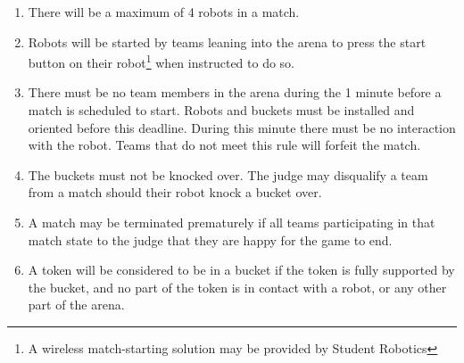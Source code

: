 \begin{enumerate}
\item There will be a maximum of 4 robots in a match.
\item Robots will be started by teams leaning into the arena to press the start button on their robot\footnote{A wireless match-starting solution may be provided by Student Robotics} when instructed to do so.

\item There must be no team members in the arena during the 1 minute before a match is scheduled to start.
      Robots and buckets must be installed and oriented before this deadline.
      During this minute there must be no interaction with the robot.
      Teams that do not meet this rule will forfeit the match.

\item The buckets must not be knocked over.
      The judge may disqualify a team from a match should their robot knock a bucket over.

\item A match may be terminated prematurely if all teams participating in that match state to the judge that they are happy for the game to end.

\item A token will be considered to be in a bucket if the token is fully supported by the bucket, and no part of the token is in contact with a robot, or any other part of the arena.

\end{enumerate}
